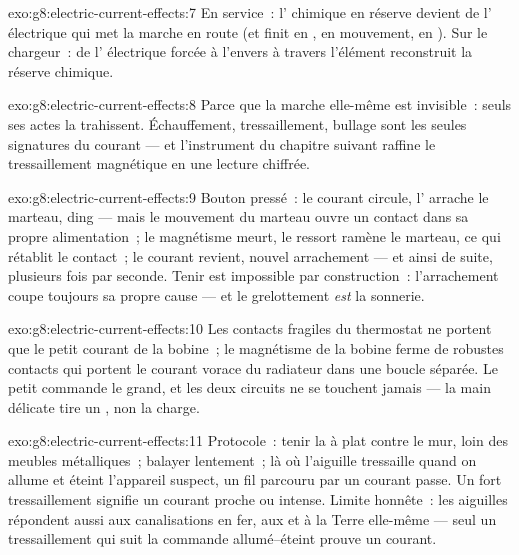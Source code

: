 \begin{solution}{exo:g8:electric-current-effects:7}
En service~: l' chimique en réserve devient de l'
électrique qui met la marche en route (et finit en , en
mouvement, en ). Sur le chargeur~: de l' électrique
forcée à l'envers à travers l'élément reconstruit la réserve
chimique.
\end{solution}

\begin{solution}{exo:g8:electric-current-effects:8}
Parce que la marche elle-même est invisible~: seuls ses actes la
trahissent. Échauffement, tressaillement, bullage sont les seules
signatures du courant --- et l'instrument du chapitre suivant
raffine le tressaillement magnétique en une lecture chiffrée.
\end{solution}

\begin{solution}{exo:g8:electric-current-effects:9}
Bouton pressé~: le courant circule, l' arrache le
marteau, ding --- mais le mouvement du marteau ouvre un contact dans
sa propre alimentation~; le magnétisme meurt, le ressort ramène le
marteau, ce qui rétablit le contact~; le courant revient, nouvel
arrachement --- et ainsi de suite, plusieurs fois par seconde. Tenir
est impossible par construction~: l'arrachement coupe toujours sa
propre cause --- et le grelottement \emph{est} la sonnerie.
\end{solution}

\begin{solution}{exo:g8:electric-current-effects:10}
Les contacts fragiles du thermostat ne portent que le petit courant
de la bobine~; le magnétisme de la bobine ferme de robustes contacts
qui portent le courant vorace du radiateur dans une boucle séparée.
Le petit commande le grand, et les deux circuits ne se touchent
jamais --- la main délicate tire un , non la charge.
\end{solution}

\begin{solution}{exo:g8:electric-current-effects:11}
Protocole~: tenir la  à plat contre le mur, loin des meubles
métalliques~; balayer lentement~; là où l'aiguille tressaille quand
on allume et éteint l'appareil suspect, un fil parcouru par un
courant passe. Un fort tressaillement signifie un courant proche ou
intense. Limite honnête~: les aiguilles répondent aussi aux
canalisations en fer, aux  et à la Terre elle-même --- seul un
tressaillement qui suit la commande allumé--éteint prouve un
courant.
\end{solution}

